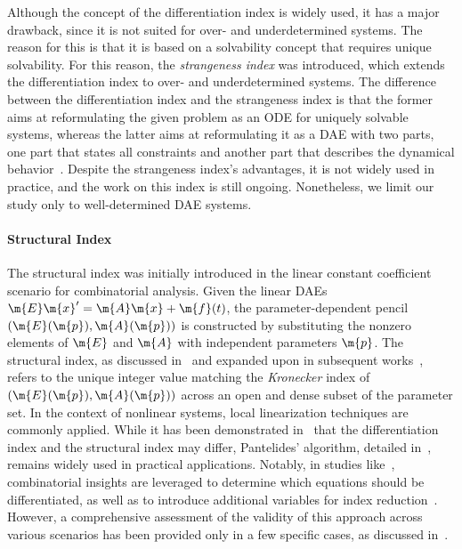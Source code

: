 Although the concept of the differentiation index is widely used, it has a major drawback, since it is not suited for over- and underdetermined systems. The reason for this is that it is based on a solvability concept that requires unique solvability. For this reason, the \emph{strangeness index} was introduced, which extends the differentiation index to over- and underdetermined systems. The difference between the differentiation index and the strangeness index is that the former aims at reformulating the given problem as an \ac{ODE} for uniquely solvable systems, whereas the latter aims at reformulating it as a \ac{DAE} with two parts, one part that states all constraints and another part that describes the dynamical behavior~\cite{mehrmann2015index}. Despite the strangeness index's advantages, it is not widely used in practice, and the work on this index is still ongoing. Nonetheless, we limit our study only to well-determined \ac{DAE} systems.

\paragraph{Structural Index}

The structural index was initially introduced in the linear constant coefficient scenario for combinatorial analysis. Given the linear \acp{DAE} $\m{E}\m{x}^{\prime} = \m{A}\m{x} + \m{f}(t)$, the parameter-dependent pencil $(\m{E}(\m{p}), \m{A}(\m{p}))$ is constructed by substituting the nonzero elements of $\m{E}$ and $\m{A}$ with independent parameters $\m{p}$. The structural index, as discussed in~\cite{pantelides1988consistent, pryce2001simple} and expanded upon in subsequent works~\cite{benveniste2021structural}, refers to the unique integer value matching the \emph{Kronecker} index of $(\m{E}(\m{p}), \m{A}(\m{p}))$ across an open and dense subset of the parameter set. In the context of nonlinear systems, local linearization techniques are commonly applied. While it has been demonstrated in~\cite{reissig2000differential} that the differentiation index and the structural index may differ, Pantelides' algorithm, detailed in~\cite{pantelides1988consistent}, remains widely used in practical applications. Notably, in studies like~\cite{unger1995structural}, combinatorial insights are leveraged to determine which equations should be differentiated, as well as to introduce additional variables for index reduction~\cite{mattsson1993index}. However, a comprehensive assessment of the validity of this approach across various scenarios has been provided only in a few specific cases, as discussed in~\cite{mehrmann2015index}.

